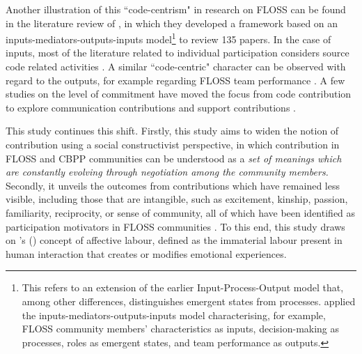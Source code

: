 Another illustration of this ``code-centrism" in research on FLOSS can be found in the literature review of \textcite{crowston2012free}, in which they developed a framework based on an inputs-mediators-outputs-inputs model\footnote{This refers to an extension of the earlier Input-Process-Output model \parencite{hackman1975group} that, among other differences, distinguishes emergent states from processes. \textcite{crowston2012free} applied the inputs-mediators-outputs-inputs model characterising, for example, FLOSS community members' characteristics as inputs, decision-making as processes, roles as emergent states, and team performance as outputs.} \parencite{ilgen2005teams} to review 135 papers. In the case of inputs, most of the literature related to individual participation considers source code related activities \parencite[e.g.,][]{luthiger2005fun, robles2005evolution, Roberts2006, fershtman2007open}. A similar ``code-centric" character can be observed with regard to the outputs, for example regarding FLOSS team performance \parencite[e.g.,][]{bezroukov1999second, samoladas2004open, gyimothy2005empirical, de2005handling}. A few studies on the level of commitment have moved the focus from code contribution \parencite[e.g.,][]{mockus2000case, mockus2002two} to explore communication contributions \parencite{crowston2006hierarchy} and support contributions \parencite{lakhani2003open}.

This study continues this shift. Firstly, this study aims to widen the notion of contribution using a social constructivist perspective, in which contribution in FLOSS and CBPP communities can be understood as a \textsl{set of meanings which are constantly evolving through negotiation among the community members.} Secondly, it unveils the outcomes from contributions which have remained less visible, including those that are intangible, such as excitement, kinship, passion, familiarity, reciprocity, or sense of community, all of which have been identified as participation motivators in FLOSS communities \parencite[e.g.,][]{zeitlyn2003gift, freeman2007material, fang2009understanding}. To this end, this study draws on \citeauthor{hardt1999affective}'s (\citeyear{hardt1999affective}) concept of affective labour, defined as the immaterial labour present in human interaction that creates or modifies emotional experiences.

